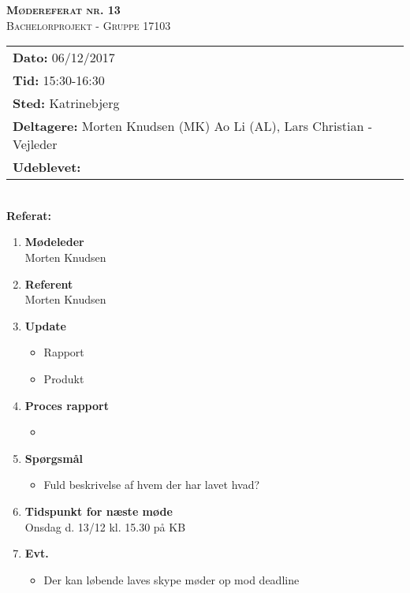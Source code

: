 
\newcommand{\HRule}{\rule{\linewidth}{0.1mm}}


	\begin{center}
		{\huge \bfseries \textsc{Mødereferat nr. 13}}\\
		\textsc{\large Bachelorprojekt - Gruppe 17103}\\[0.3cm]
	\end{center}
	\begin{tabular}{ll}
	\large \textbf{Dato:} 06/12/2017  	\\ %
	\large \textbf{Tid:}  15:30-16:30 	\\ %
	\large \textbf{Sted:} Katrinebjerg		\\ %
	\large \textbf{Deltagere:} Morten Knudsen (MK) Ao Li (AL), Lars Christian - Vejleder \\
	\large \textbf{Udeblevet:} 
	\end{tabular}\\
	\phantom{\,}\hspace{0.1em} \large \textbf{Referat:}
	\begin{enumerate}
		\itemsep 0.3em 
		\item \textbf{Mødeleder}\\
			Morten Knudsen
		\item \textbf{Referent}\\
			Morten Knudsen

		\item \textbf{Update}
			\begin{itemize}[-]
				\item Rapport 
				\item Produkt
				
				
			\end{itemize}
		
		\item \textbf{Proces rapport}
		\begin{itemize}[-]
			\item 
		
		\end{itemize}
			
		\item \textbf{Spørgsmål}
			\begin{itemize}[-]
				\item Fuld beskrivelse af hvem der har lavet hvad?
				
			\end{itemize}
	
		\item \textbf{Tidspunkt for næste møde} \\
			Onsdag d. 13/12 kl. 15.30 på KB
			
		\item \textbf{Evt.}
			\begin{itemize}[-]
				\item Der kan løbende laves skype møder op mod deadline
			\end{itemize}
			
	\end{enumerate}
